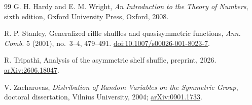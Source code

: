 \documentclass[11pt]{article}
\theoremstyle{definition}
\theoremstyle{remark}
\begin{document}
\begin{thebibliography}{99}
G. H. Hardy and E. M. Wright,
\newblock \emph{An Introduction to the Theory of Numbers},
\newblock sixth edition, Oxford University Press, Oxford, 2008.

R. P. Stanley,
\newblock Generalized riffle shuffles and quasisymmetric functions,
\newblock \emph{Ann. Comb.} 5 (2001), no.~3--4, 479--491.
\newblock \href{https://doi.org/10.1007/s00026-001-8023-7}
{doi:10.1007/s00026-001-8023-7}.

R. Tripathi,
\newblock Analysis of the asymmetric shelf shuffle,
\newblock preprint, 2026.
\newblock \href{https://arxiv.org/abs/2606.18047}{arXiv:2606.18047}.

V. Zacharovas,
\newblock \emph{Distribution of Random Variables on the Symmetric Group},
\newblock doctoral dissertation, Vilnius University, 2004;
\newblock \href{https://arxiv.org/abs/0901.1733}{arXiv:0901.1733}.

\end{thebibliography}
\end{document}
